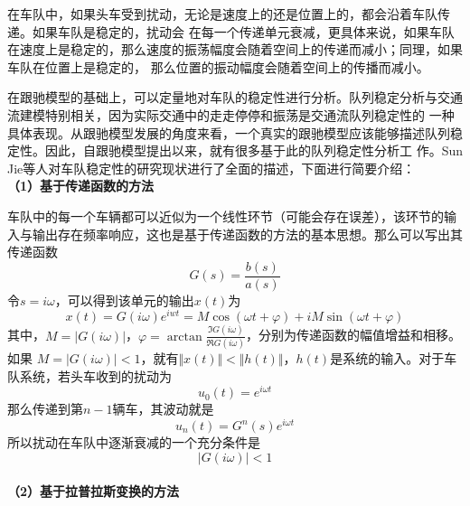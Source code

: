 在车队中，如果头车受到扰动，无论是速度上的还是位置上的，都会沿着车队传递。如果车队是稳定的，扰动会
在每一个传递单元衰减，更具体来说，如果车队在速度上是稳定的，那么速度的振荡幅度会随着空间上的传递而减小；同理，如果车队在位置上是稳定的，
那么位置的振动幅度会随着空间上的传播而减小。

在跟驰模型的基础上，可以定量地对车队的稳定性进行分析。队列稳定分析与交通流建模特别相关，因为实际交通中的走走停停和振荡是交通流队列稳定性的
一种具体表现。从跟驰模型发展的角度来看，一个真实的跟驰模型应该能够描述队列稳定性。因此，自跟驰模型提出以来，就有很多基于此的队列稳定性分析工
作。Sun Jie等人对车队稳定性的研究现状进行了全面的描述\cite{SUN2018212}，下面进行简要介绍： \\

\noindent \textbf{（1）基于传递函数的方法}

车队中的每一个车辆都可以近似为一个线性环节（可能会存在误差），该环节的输入与输出存在频率响应，这也是基于传递函数的方法的基本思想。那么可以写出其传递函数
\begin{equation}
  G(s) = \frac{b(s)}{a(s)}
  \label{eq:chap01-5}
\end{equation}
令$s=i\omega$，可以得到该单元的输出$x(t)$为
\begin{equation}
  x(t) = G(i\omega)e^{iwt} = M\cos(\omega t+\varphi) + iM\sin(\omega t+\varphi)
  \label{eq:chap01-6}
\end{equation}
其中，$M = |G(i\omega)|$，$\varphi = \arctan \frac{\Im G(i\omega)}{\Re G(i\omega)}$，分别为传递函数的幅值增益和相移。如果
$M = |G(i\omega)| < 1$，就有$\Vert x(t) \Vert < \Vert h(t) \Vert$，$h(t)$是系统的输入。对于车队系统，若头车收到的扰动为
\begin{equation}
  u_0(t) = e^{i\omega t}
  \label{eq:chap01-7}
\end{equation}
那么传递到第$n-1$辆车，其波动就是
\begin{equation}
  u_n(t) = G^n(s)e^{i\omega t}
  \label{eq:chap01-8}
\end{equation}
所以扰动在车队中逐渐衰减的一个充分条件是
\begin{equation}
  |G(i\omega)| < 1
  \label{eq:chap01-9}
\end{equation} \\

\noindent \textbf{（2）基于拉普拉斯变换的方法}

